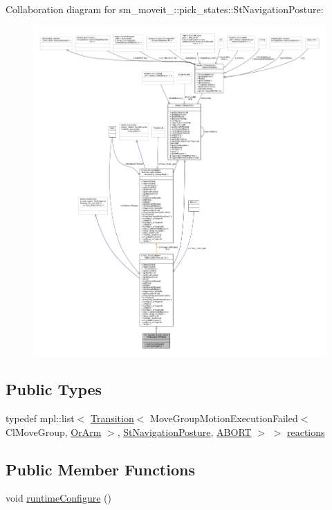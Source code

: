 Collaboration diagram for sm\+\_\+moveit\+\_\+:\+:pick\+\_\+states\+:\+:St\+Navigation\+Posture\+:
\nopagebreak
\begin{figure}[H]
\begin{center}
\leavevmode
\includegraphics[width=350pt]{structsm__moveit__4_1_1pick__states_1_1StNavigationPosture__coll__graph}
\end{center}
\end{figure}
\subsection*{Public Types}
\begin{DoxyCompactItemize}
\item 
typedef mpl\+::list$<$ \hyperlink{classsmacc_1_1Transition}{Transition}$<$ Move\+Group\+Motion\+Execution\+Failed$<$ Cl\+Move\+Group, \hyperlink{classsm__moveit__4_1_1OrArm}{Or\+Arm} $>$, \hyperlink{structsm__moveit__4_1_1pick__states_1_1StNavigationPosture}{St\+Navigation\+Posture}, \hyperlink{structsmacc_1_1default__transition__tags_1_1ABORT}{A\+B\+O\+RT} $>$ $>$ \hyperlink{structsm__moveit__4_1_1pick__states_1_1StNavigationPosture_a8f3ad7c040b08e1da62aabb3caa6a8e9}{reactions}
\end{DoxyCompactItemize}
\subsection*{Public Member Functions}
\begin{DoxyCompactItemize}
\item 
void \hyperlink{structsm__moveit__4_1_1pick__states_1_1StNavigationPosture_a224f91484ed745b360dd97c0fef63567}{runtime\+Configure} ()
\end{DoxyCompactItemize}
